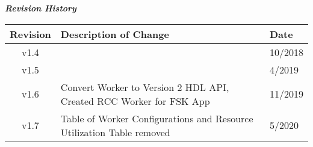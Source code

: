 \iffalse
This file is protected by Copyright. Please refer to the COPYRIGHT file
distributed with this source distribution.

This file is part of OpenCPI <http://www.opencpi.org>

OpenCPI is free software: you can redistribute it and/or modify it under the
terms of the GNU Lesser General Public License as published by the Free Software
Foundation, either version 3 of the License, or (at your option) any later
version.

OpenCPI is distributed in the hope that it will be useful, but WITHOUT ANY
WARRANTY; without even the implied warranty of MERCHANTABILITY or FITNESS FOR A
PARTICULAR PURPOSE. See the GNU Lesser General Public License for more details.

You should have received a copy of the GNU Lesser General Public License along
with this program. If not, see <http://www.gnu.org/licenses/>.
\fi

\def\comp{phase\_{}to\_{}amp\_{}cordic}
\edef\ecomp{phase_to_amp_cordic}
\def\Comp{Phase to Amplitude CORDIC}
\def\docTitle{\Comp{} Component Data Sheet}
\def\snippetpath{../../../../../../doc/av/tex/snippets}

\graphicspath{{figures/}}


\maketitle
\thispagestyle{empty}
\newpage

\begin{center}
	\textit{\textbf{Revision History}}
	\begin{table}[H]
	\label{table:revisions} %
		\begin{tabularx}{\textwidth}{|c|X|l|}
		\hline
		\rowcolor{blue}
		\textbf{Revision} & \textbf{Description of Change} & \textbf{Date} \\
		\hline
		v1.4 & & 10/2018 \\
		\hline
		v1.5 & & 4/2019\\
		\hline
		v1.6 & Convert Worker to Version 2 HDL API, Created RCC Worker for FSK App & 11/2019\\
		\hline
		v1.7 & Table of Worker Configurations and Resource Utilization Table removed & 5/2020 \\
			\hline
		\end{tabularx}
	\end{table}
\end{center}
\newpage

